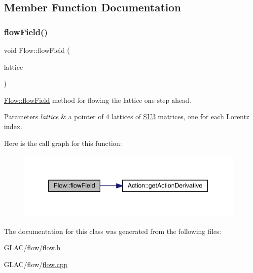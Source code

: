 \subsection{Member Function Documentation}
\mbox{\label{class_flow_a284b490ddedc9cf5d0f2ab0660c328f6}} 
\subsubsection{\texorpdfstring{flowField()}{flowField()}}
{\footnotesize\ttfamily void Flow\+::flow\+Field (\begin{DoxyParamCaption}\item[{\mbox{\hyperlink{class_lattice}{Lattice}}$<$ \mbox{\hyperlink{class_s_u3}{S\+U3}} $>$ $\ast$}]{lattice }\end{DoxyParamCaption})}



\mbox{\hyperlink{class_flow_a284b490ddedc9cf5d0f2ab0660c328f6}{Flow\+::flow\+Field}} method for flowing the lattice one step ahead. 


\begin{DoxyParams}{Parameters}
{\em lattice} & a pointer of 4 lattices of \mbox{\hyperlink{class_s_u3}{S\+U3}} matrices, one for each Lorentz index. \\
\hline
\end{DoxyParams}
Here is the call graph for this function\+:\nopagebreak
\begin{figure}[H]
\begin{center}
\leavevmode
\includegraphics[width=334pt]{class_flow_a284b490ddedc9cf5d0f2ab0660c328f6_cgraph}
\end{center}
\end{figure}


The documentation for this class was generated from the following files\+:\begin{DoxyCompactItemize}
\item 
G\+L\+A\+C/flow/\mbox{\hyperlink{flow_8h}{flow.\+h}}\item 
G\+L\+A\+C/flow/\mbox{\hyperlink{flow_8cpp}{flow.\+cpp}}\end{DoxyCompactItemize}
